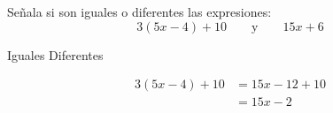 


Señala si son iguales o diferentes las expresiones: \[3(5x-4) + 10\qquad\text{y}\qquad15x+6\]
\begin{oneparchoices}
    \choice Iguales
    \CorrectChoice Diferentes
\end{oneparchoices}
\begin{solutionbox}{2.5cm}
    \begin{align*}
        3(5x-4) + 10 & =15x-12+10 \\
                     & =15x-2
    \end{align*}
\end{solutionbox}


